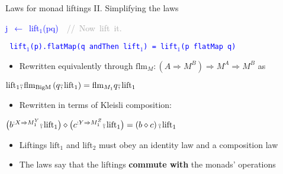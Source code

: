 \documentclass[english]{beamer}
\newenvironment{lyxcode}
  {\par\begin{list}{}{
    \setlength{\rightmargin}{\leftmargin}
    \setlength{\listparindent}{0pt}%
    \raggedright
    \setlength{\itemsep}{0pt}
    \setlength{\parsep}{0pt}
    \normalfont\ttfamily}%
   \def\{{\char`\{}
   \def\}{\char`\}}
   \def\textasciitilde{\char`\~}
   \item[]}
  {\end{list}}
\newcommand{\bef}{\ensuremath\raisebox{2pt}{$\mathsmaller{\mathsmaller{\circ}}$}\hspace{-3.3pt},}
\begin{document}
\begin{frame}{Laws for monad liftings II. Simplifying the laws}
\begin{minipage}[t]{0.5\columnwidth}
\begin{lyxcode}
\textcolor{blue}{\footnotesize{}j~$\leftarrow$~lift$_{1}$(pq)}\textrm{\textcolor{darkgray}{\footnotesize{}~~//~Now~lift~it.}}{\footnotesize\par}
\end{lyxcode}
%
\end{minipage}\texttt{\textcolor{blue}{\footnotesize{}\medskip{}
lift$_{1}$(p).flatMap(q andThen lift$_{1}$) = lift$_{1}$(p flatMap
q)}}{\footnotesize\par}
\begin{itemize}
\item Rewritten equivalently through $\text{flm}_{M}:\left(A\Rightarrow M^{B}\right)\Rightarrow M^{A}\Rightarrow M^{B}$
as
\end{itemize}
\begin{center}
{\footnotesize{}\vspace{-0.2cm}\hspace{-0.0cm}$\text{lift}_{1}\bef\text{flm}_{\text{BigM}}\left(q\bef\text{lift}_{1}\right)=\text{flm}_{M_{1}}q\bef\text{lift}_{1}$}{\footnotesize\par}
\par\end{center}
\begin{itemize}
\item {\footnotesize{}\vspace{-0.2cm}\hspace{-0.0cm}}Rewritten in terms
of Kleisli composition:
\end{itemize}
\begin{center}
{\footnotesize{}\vspace{-0.2cm}\hspace{-0.0cm}$\big(b^{:X\Rightarrow M_{1}^{Y}}\bef\text{lift}_{1}\big)\diamond\big(c^{:Y\Rightarrow M_{1}^{Z}}\bef\text{lift}_{1}\big)=\left(b\diamond c\right)\bef\text{lift}_{1}$}{\footnotesize\par}
\par\end{center}
\begin{itemize}
\item {\footnotesize{}\vspace{-0.3cm}\hspace{-0.0cm}}Liftings $\text{lift}_{1}$
and $\text{lift}_{2}$ must obey an identity law and a composition
law
\item The laws say that the liftings \textbf{commute with} the monads' operations
\end{itemize}
\end{frame}
\end{document}
